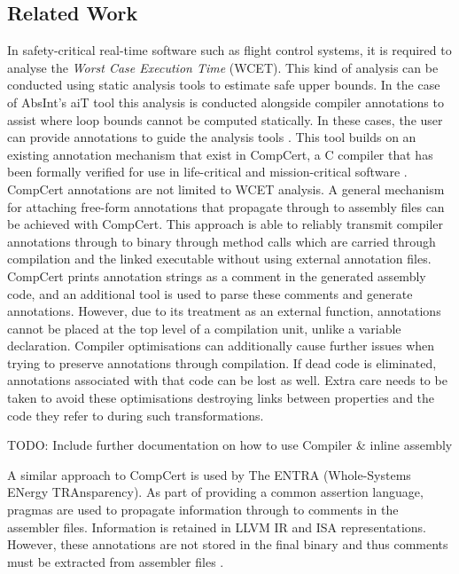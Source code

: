 \documentclass[twocolumn]{article}
\begin{document}
\subsection{Related Work}
In safety-critical real-time software such as flight control systems, it is required to analyse the \textit{Worst Case Execution Time} (WCET). This kind of analysis can be conducted using static analysis tools to estimate safe upper bounds. In the case of AbsInt's aiT tool this analysis is conducted alongside compiler annotations to assist where loop bounds cannot be computed statically. In these cases, the user can provide annotations to guide the analysis tools \cite{schommer2018embedded}. This tool builds on an existing annotation mechanism that exist in CompCert, a C compiler that has been formally verified for use in life-critical and mission-critical software \cite{compcert}\cite{leroy2016compcert}. CompCert annotations are not limited to WCET analysis. A general mechanism for attaching free-form annotations that propagate through to assembly files can be achieved with CompCert. This approach is able to reliably transmit compiler annotations through to binary through method calls which are carried through compilation and the linked executable without using external annotation files. CompCert prints annotation strings as a comment in the generated assembly code, and an additional tool is used to parse these comments and generate annotations. However, due to its treatment as an external function, annotations cannot be placed at the top level of a compilation unit, unlike a variable declaration. Compiler optimisations can additionally cause further issues when trying to preserve annotations through compilation. If dead code is eliminated, annotations associated with that code can be lost as well. Extra care needs to be taken to avoid these optimisations destroying links between properties and the code they refer to during such transformations.

\label{section:compCert}
TODO: Include further documentation on how to use Compiler \& inline assembly

A similar approach to CompCert is used by The ENTRA (Whole-Systems ENergy TRAnsparency). As part of providing a common assertion language, pragmas are used to propagate information through to comments in the assembler files. Information is retained in LLVM IR and ISA representations. However, these annotations are not stored in the final binary and thus comments must be extracted from assembler files \cite{eder2013common}.
\end{document}
